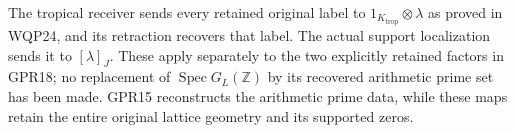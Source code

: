 The tropical receiver sends every retained
original label to $1_{K_{\mathrm{trop}}}\otimes\lambda$
as proved in WQP24, and its retraction recovers
that label. The actual support localization sends
it to $[\lambda]_J$. These apply separately to
the two explicitly retained factors in GPR18;
no replacement of $\operatorname{Spec}G_L(\mathbb Z)$
by its recovered arithmetic prime set has been
made. GPR15 reconstructs the arithmetic prime
data, while these maps retain the entire original
lattice geometry and its supported zeros.
